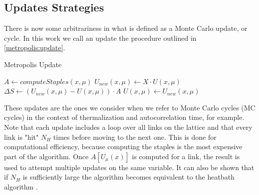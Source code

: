 \begin{figure}[!htb]

    \label{fig:staples}
\end{figure}


\subsection{Updates Strategies}
There is now some arbitrariness in what is defined as a Monte Carlo update, or cycle. In this work we call an update the procedure outlined in \cref{metropolis:update}. 

\begin{algorithm}[bht!]
    \caption{Metropolis Update}\label{metropolis:update}
    \begin{algorithmic}[1]
        \State $A \gets computeStaples(x,\mu)$     
            \State $U_{new}(x,\mu)  \gets X\cdot U(x,\mu)$  
            \State $\Delta S \gets (U_{new}(x,\mu)  - U(x,\mu) )\cdot A$
                \State $U(x,\mu)  \gets U_{new}(x,\mu)$
            \EndIf
        \EndFor
    \EndFor
\end{algorithmic}
\end{algorithm}

These updates are the ones we consider when we refer to Monte Carlo cycles (MC cycles) in the context of thermalization and autocorrelation time, for example. Note that each update includes a loop over all links on the lattice and that every link is "hit" $N_H$ times before moving to the next one. This is done for computational efficiency, because computing the staples is the most expensive part of the algorithm. Once $A[U_\mu(x)]$ is computed for a link, the result is used to attempt multiple updates on the same variable. It can also be shown that if $N_H$ is sufficiently large the algorithm becomes equivalent to the heatbath algorithm \cite{gattringer_quantum_2010}. 

